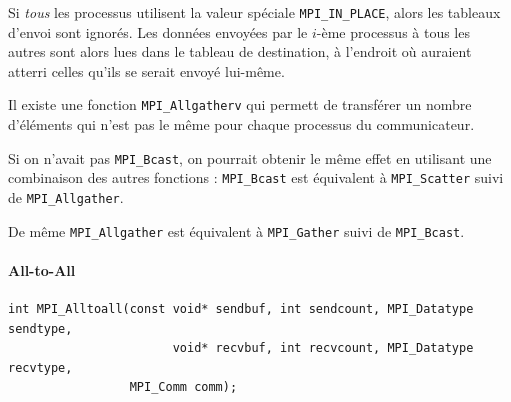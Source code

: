 Si \emph{tous} les processus utilisent la valeur spéciale
\verb|MPI_IN_PLACE|, alors les tableaux d'envoi sont ignorés. Les
données envoyées par le $i$-ème processus à tous les autres sont alors
lues dans le tableau de destination, à l'endroit où auraient atterri
celles qu'ils se serait envoyé lui-même.

\begin{center}
\end{center}

\begin{ddanger}
  Il existe une fonction \verb|MPI_Allgatherv| qui permett de transférer un
  nombre d'éléments qui n'est pas le même pour chaque processus du
  communicateur.
\end{ddanger}

Si on n'avait pas \verb|MPI_Bcast|, on pourrait obtenir le même effet en
utilisant une combinaison des autres fonctions : \verb|MPI_Bcast| est équivalent
à \verb|MPI_Scatter| suivi de \verb|MPI_Allgather|.

De même \verb|MPI_Allgather| est équivalent à \verb|MPI_Gather| suivi de \verb|MPI_Bcast|.

\paragraph{All-to-All}

\begin{verbatim}
int MPI_Alltoall(const void* sendbuf, int sendcount, MPI_Datatype sendtype,
                       void* recvbuf, int recvcount, MPI_Datatype recvtype,
                 MPI_Comm comm);
\end{verbatim}


